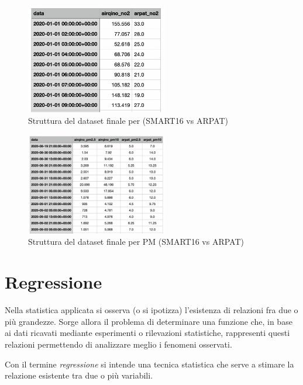 \begin{figure}[H]
\centering
\captionsetup{justification=centering}
\includegraphics[width=0.55\textwidth,height=\textheight,keepaspectratio]{img/no2_ds_final}
\caption{Struttura del dataset finale per  (SMART16 vs ARPAT)}
\label{fig:no2-ds-final}
\end{figure}

\begin{figure}[H]
\centering
\captionsetup{justification=centering}
\includegraphics[width=0.55\textwidth,height=\textheight,keepaspectratio]{img/pm_ds_final}
\caption{Struttura del dataset finale per PM (SMART16 vs ARPAT)}
\label{fig:pm-ds-final}
\end{figure}

\section{Regressione}\label{sec:regressione}
Nella statistica applicata si osserva (o si ipotizza) l’esistenza di relazioni fra due o più grandezze. Sorge allora il problema di determinare una funzione che, in base ai dati ricavati mediante esperimenti o rilevazioni statistiche, rappresenti questi relazioni permettendo di analizzare meglio i fenomeni osservati. 

Con il termine \textit{regressione} si intende una tecnica statistica che serve a stimare la relazione esistente tra due o più variabili.

